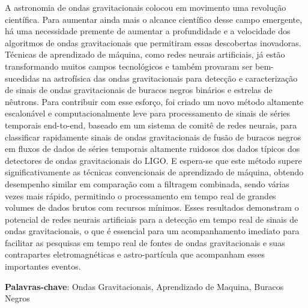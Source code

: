 \setlength{\absparsep}{18pt} %
\begin{resumo}
 
A astronomia de ondas gravitacionais colocou em movimento uma revolução científica. Para aumentar ainda mais o alcance científico desse campo emergente, há uma necessidade premente de aumentar a profundidade e a velocidade dos algoritmos de ondas gravitacionais que permitiram essas descobertas inovadoras. Técnicas de aprendizado de máquina, como redes neurais artificiais, já estão transformando muitos campos tecnológicos e também provaram ser bem-sucedidas na astrofísica das ondas gravitacionais para detecção e caracterização de sinais de ondas gravitacionais de buracos negros binários e estrelas de nêutrons. Para contribuir com esse esforço, foi criado um novo método altamente escalonável e computacionalmente leve para processamento de sinais de séries temporais end-to-end, baseado em um sistema de comitê de redes neurais, para classificar rapidamente sinais de ondas gravitacionais de fusão de buracos negros em fluxos de dados de séries temporais altamente ruidosos dos dados típicos dos detectores de ondas gravitacionais do LIGO. E espera-se que este método supere significativamente as técnicas convencionais de aprendizado de máquina, obtendo desempenho similar em comparação com a filtragem combinada, sendo várias vezes mais rápido, permitindo o processamento em tempo real de grandes volumes de dados brutos com recursos mínimos. Esses resultados demonstram o potencial de redes neurais artificiais para a detecção em tempo real de sinais de ondas gravitacionais, o que é essencial para um acompanhamento imediato para facilitar as pesquisas em tempo real de fontes de ondas gravitacionais e suas contrapartes eletromagnéticas e astro-partícula que acompanham esses importantes eventos.

 \textbf{Palavras-chave}: Ondas Gravitacionais, Aprendizado de Maquina, Buracos Negros
\end{resumo}

